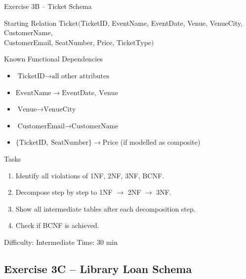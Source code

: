 \documentclass[10pt]{beamer}
\begin{document}
\begin{frame}{Exercise 3B -- Ticket Schema}
  \begin{block}{Starting Relation}
    $\text{Ticket}($TicketID, EventName, EventDate, Venue, VenueCity, CustomerName,\\
    \hspace{2.4cm} CustomerEmail, SeatNumber, Price, TicketType$)$
  \end{block}

  \begin{block}{Known Functional Dependencies}
    \begin{itemize}
      \item $\text{TicketID} \to \text{all other attributes}$
      \item $\text{EventName} \to \text{EventDate},\ \text{Venue}$
      \item $\text{Venue} \to \text{VenueCity}$
      \item $\text{CustomerEmail} \to \text{CustomerName}$
      \item $\{\text{TicketID},\ \text{SeatNumber}\} \to \text{Price}$ \quad (if modelled as composite)
    \end{itemize}
  \end{block}

  \begin{block}{Tasks}
    \begin{enumerate}
      \item Identify all violations of 1NF, 2NF, 3NF, BCNF.
      \item Decompose step by step to 1NF $\to$ 2NF $\to$ 3NF.
      \item Show all intermediate tables after each decomposition step.
      \item Check if BCNF is achieved.
    \end{enumerate}
  \end{block}

  \begin{alertblock}{Difficulty: Intermediate \quad Time: 30 min}
  \end{alertblock}
\end{frame}

\subsection{Exercise 3C -- Library Loan Schema}
\end{document}
